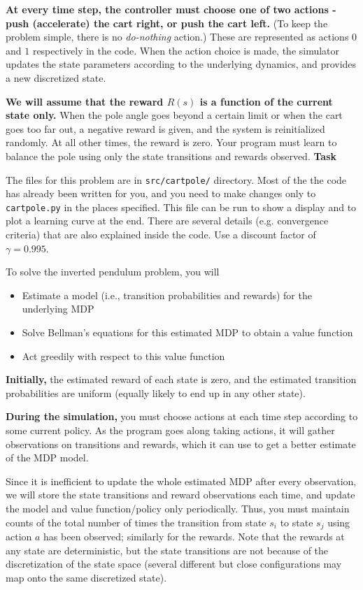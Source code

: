 \textbf{At every time step, the controller must choose one of two actions -
push (accelerate) the cart right, or push the cart left.}
(To keep the problem simple, there is no {\it do-nothing} action.)
These are represented as actions $0$ and $1$ respectively in the code.  
When the action choice is made, the simulator updates the state parameters 
according to the underlying dynamics, and provides a new discretized state.

\textbf{We will assume that the reward $R(s)$ is a function of the current state only.}
When the pole angle goes beyond a certain limit or when the cart goes
too far out, a negative reward is given, and the system is reinitialized 
randomly. At all other times, the reward is zero.  Your program must learn 
to balance the pole using only the state transitions and rewards observed.
\newpage
\textbf{Task} 

The files for this problem are in {\tt src/cartpole/} directory.
Most of the the code has already been written for you, and you need 
to make changes only to {\tt cartpole.py} in the places specified. This 
file can be run to show a display and to plot a learning curve 
at the end.  There are several details (e.g. convergence criteria) that are also explained inside the code. Use a discount factor of $\gamma = 0.995$.  

 To solve the inverted pendulum problem, you will 
 \begin{itemize}
     \item  Estimate a   model (i.e., transition probabilities and rewards) for the underlying MDP
     \item Solve Bellman's equations for this estimated MDP to obtain a value function
     \item Act greedily with respect to this value function
 \end{itemize}
 
  \textbf{Initially,} the estimated reward of each state is zero,
  and the estimated transition probabilities are uniform (equally likely 
  to end up in any other state).

  \textbf{During the simulation,} you must choose actions at each time step 
  according to some current policy.  As the program goes along taking 
  actions, it will gather observations on transitions and rewards,
  which it can use to get a better estimate of the MDP model.
  
  Since it is inefficient to update the whole estimated MDP after every 
  observation, we will store the state transitions and reward observations 
  each time, and update the model and value function/policy only periodically. 
  Thus, you must maintain counts of the total number of times the 
  transition from state $s_i$ to state $s_j$ using action $a$ has been 
  observed; similarly for the rewards.  Note that the rewards at 
  any state are deterministic, but the state transitions are not because 
  of the discretization of the state space (several different but close
  configurations may map onto the same discretized state).

